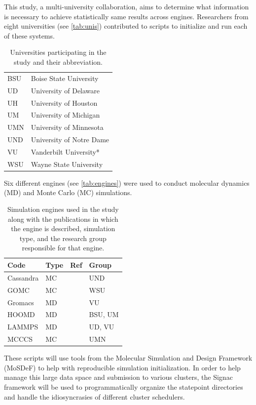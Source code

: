 This study, a multi-university collaboration, aims to determine what information is necessary to achieve statistically same results across engines.
Researchers from eight universities (see \autoref{tab:unis}) contributed to scripts to initialize and run each of these systems.
\begin{table}[h!]
\caption{Universities participating in the study and their abbreviation.}\label{tab:unis}
\centering
\begin{tabular}{ll}
BSU & Boise State University \\
UD & University of Delaware \\
UH & University of Houston \\
UM & University of Michigan \\
UMN & University of Minnesota \\
UND & University of Notre Dame \\
VU & Vanderbilt University* \\
WSU & Wayne State University
\end{tabular}
\end{table}
Six different engines (see \autoref{tab:engines}) were used to conduct molecular dynamics (MD) and Monte Carlo (MC) simulations.
\begin{table}[h!]
\caption{Simulation engines used in the study along with the publications in which the engine is described, simulation type, and the research group responsible for that engine.}\label{tab:engines}
\centering
\begin{tabular}{llll}
Code      & Type & Ref             & Group   \\ \hline
Cassandra & MC   & \cite{Shah2017} & UND     \\
GOMC      & MC   & \cite{Shah2017} & WSU     \\
Gromacs   & MD   & \cite{ABRAHAM201519, Pall2015, 10.1093/bioinformatics/btt055, Lindahl2001, BERENDSEN199543, https://doi.org/10.1002/jcc.20291, Hess2008} & VU      \\
HOOMD     & MD   & \cite{Anderson2020, Nguyen2011a, Glaser2020a, Lebard2012} & BSU, UM \\
LAMMPS    & MD   & \cite{LAMMPS} & UD, VU  \\
MCCCS     & MC   & \cite{C8SC05340E,Josephson2019} & UMN    
\end{tabular}
\end{table}
These scripts will use tools from the Molecular Simulation and Design Framework (MoSDeF) to help with reproducible simulation initialization.
In order to help manage this large data space and submission to various clusters, the Signac framework will be used to programmatically organize the statepoint directories and handle the idiosyncrasies of different cluster schedulers.
